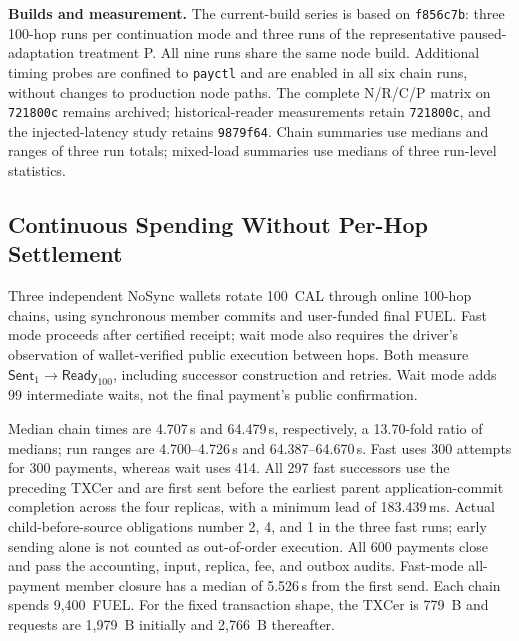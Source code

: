 \noindent\textbf{Builds and measurement.}
The current-build series is based on \texttt{f856c7b}: three
100-hop runs per continuation mode and three runs of the
representative paused-adaptation treatment P. All nine runs
share the same node build. Additional timing probes are confined
to \texttt{payctl} and are enabled in all six chain runs, without
changes to production node paths. The complete N/R/C/P matrix
on \texttt{721800c} remains archived; historical-reader measurements
retain \texttt{721800c}, and the injected-latency study retains
\texttt{9879f64}. Chain summaries use medians and ranges of three
run totals; mixed-load summaries use medians of three run-level
statistics.

\subsection{Continuous Spending Without Per-Hop Settlement}

Three independent NoSync wallets rotate 100~CAL through online
100-hop chains, using synchronous member commits and user-funded
final FUEL. Fast mode proceeds after certified receipt; wait mode
also requires the driver's observation of wallet-verified public
execution between hops. Both measure
$\mathsf{Sent}_1 \rightarrow \mathsf{Ready}_{100}$, including
successor construction and retries. Wait mode adds 99 intermediate
waits, not the final payment's public confirmation.

Median chain times are 4.707\,s and 64.479\,s, respectively,
a 13.70-fold ratio of medians; run ranges are 4.700--4.726\,s
and 64.387--64.670\,s. Fast uses 300 attempts for 300 payments,
whereas wait uses 414. All 297 fast successors use the preceding
TXCer and are first sent before the earliest parent
application-commit completion across the four replicas, with a
minimum lead of 183.439\,ms. Actual child-before-source obligations
number 2, 4, and 1 in the three fast runs; early sending alone is
not counted as out-of-order execution. All 600 payments close and
pass the accounting, input, replica, fee, and outbox audits.
Fast-mode all-payment member closure has a median of 5.526\,s
from the first send. Each chain spends 9,400~FUEL. For the fixed
transaction shape, the TXCer is 779~B and requests are 1,979~B
initially and 2,766~B thereafter.

